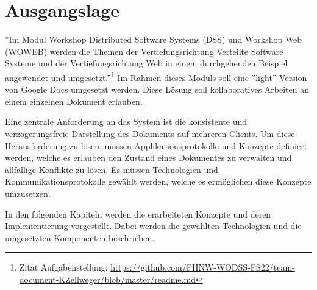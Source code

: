 \section{Ausgangslage}

''Im Modul Workshop Distributed Software Systems (DSS) und Workshop Web (WOWEB) werden die Themen der Vertiefungsrichtung Verteilte Software Systeme und der Vertiefungsrichtung Web in einem durchgehenden Beispiel angewendet und umgesetzt.''\footnote{Zitat Aufgabenstellung: \href{https://github.com/FHNW-WODSS-FS22/team-document-KZellweger/blob/master/readme.md}{https://github.com/FHNW-WODSS-FS22/team-document-KZellweger/blob/master/readme.md}}
Im Rahmen dieses Moduls soll eine ''light'' Version von Google Docs umgesetzt werden.
Diese Lösung soll kollaboratives Arbeiten an einem einzelnen Dokument erlauben.

Eine zentrale Anforderung an das System ist die konsistente und verzögerungsfreie Darstellung des Dokuments auf mehreren Clients.
Um diese Herausforderung zu lösen, müssen Applikationsprotokolle und Konzepte definiert werden, welche es erlauben den Zustand eines Dokumentes zu verwalten und allfällige Konflikte zu lösen.
Es müssen Technologien und Kommunikationsprotokolle gewählt werden, welche es ermöglichen diese Konzepte umzusetzen.

In den folgenden Kapiteln werden die erarbeiteten Konzepte und deren Implementierung vorgestellt.
Dabei werden die gewählten Technologien und die umgesetzten Komponenten beschrieben.
